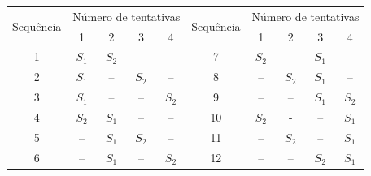 \begin{enumerate}[noitemsep]
\begin{exemplo}{}{}
\begin{center}
	\begin{tabular}{|c|cccc|c|cccc|}
		\hline
		\multirow{2}{*}{Sequência} & \multicolumn{4}{c|}{Número de tentativas}                                        & \multirow{2}{*}{Sequência} & \multicolumn{4}{c|}{Número de tentativas}                                        \\ \cline{2-5} \cline{7-10} 
		& \multicolumn{1}{c|}{1} & \multicolumn{1}{c|}{2} & \multicolumn{1}{c|}{3} & 4     &                            & \multicolumn{1}{c|}{1} & \multicolumn{1}{c|}{2} & \multicolumn{1}{c|}{3} & 4     \\ \hline
		1                          & $S_1$                  & $S_2$                  & --                     & --    & 7                          & $S_2$                  & --                     & $S_1$                  & --    \\ \cline{1-1} \cline{6-6}
		2                          & $S_1$                  & --                     & $S_2$                  & --    & 8                          & --                     & $S_2$                  & $S_1$                  & --    \\ \cline{1-1} \cline{6-6}
		3                          & $S_1$                  & --                     & --                     & $S_2$ & 9                          & --                     & --                     & $S_1$                  & $S_2$ \\ \cline{1-1} \cline{6-6}
		4                          & $S_2$                  & $S_1$                  & --                     & --    & 10                         & $S_2$                  & -                      & --                     & $S_1$ \\ \cline{1-1} \cline{6-6}
		5                          & --                     & $S_1$                  & $S_2$                  & --    & 11                         & --                     & $S_2$                  & --                     & $S_1$ \\ \cline{1-1} \cline{6-6}
		6                          & --                     & $S_1$                  & --                     & $S_2$ & 12                         & --                     & --                     & $S_2$                  & $S_1$ \\ \hline
	\end{tabular}
	\label{tab:3-1}
\end{center}


\end{exemplo}
\end{enumerate}
